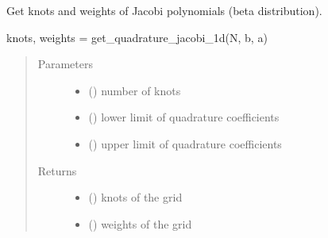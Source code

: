 \documentclass[letterpaper,10pt,english,openany,oneside]{sphinxmanual}
\begin{document}
\begin{fulllineitems}
\label{\detokenize{pygpc:pygpc.grid.get_quadrature_jacobi_1d}}
Get knots and weights of Jacobi polynomials (beta distribution).

knots, weights = get\_quadrature\_jacobi\_1d(N, b, a)
\begin{quote}\begin{description}
\item[{Parameters}] \leavevmode\begin{itemize}
\item {} 
 () \textendash{} number of knots

\item {} 
 () \textendash{} lower limit of quadrature coefficients

\item {} 
 () \textendash{} upper limit of quadrature coefficients

\end{itemize}

\item[{Returns}] \leavevmode
\begin{itemize}
\item {} 
 () \textendash{} knots of the grid

\item {} 
 () \textendash{} weights of the grid

\end{itemize}


\end{description}\end{quote}

\end{fulllineitems}

\end{document}
